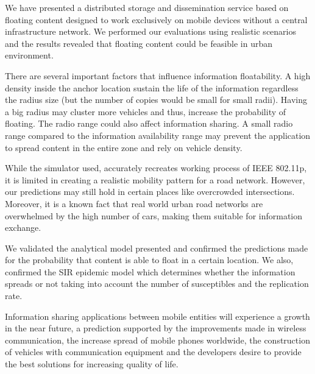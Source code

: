 We have presented a distributed storage and dissemination service based on
floating content designed to work exclusively on mobile devices without a
central infrastructure network. We performed our evaluations using realistic
scenarios and the results revealed that floating content could be feasible in
urban environment.

There are several important factors that influence information floatability.
A high density inside the anchor location sustain the life of the information
regardless the radius size (but the number of copies would be small for small
radii). Having a big radius may cluster more vehicles and thus,
increase the probability of floating. The radio range could also affect
information sharing. A small radio range compared to the information
availability range may prevent the application to spread content in the entire
zone and rely on vehicle density.

While the simulator used, accurately recreates working process of IEEE 802.11p,
it is limited in creating a realistic mobility pattern for a road network.
However, our predictions may still hold in certain places like overcrowded
intersections. Moreover, it is a known fact that real world urban road networks
are overwhelmed by the high number of cars, making them suitable for information
exchange.

We validated the analytical model presented and confirmed the predictions made
for the probability that content is able to float in a certain location. We
also, confirmed the SIR epidemic model which determines whether the information
spreads or not taking into account the number of susceptibles and the
replication rate.

Information sharing applications between mobile entities will experience a
growth in the near future, a prediction supported by the improvements made in
wireless communication, the increase spread of mobile phones worldwide, the
construction of vehicles with communication equipment and the developers desire
to provide the best solutions for increasing quality of life. 
